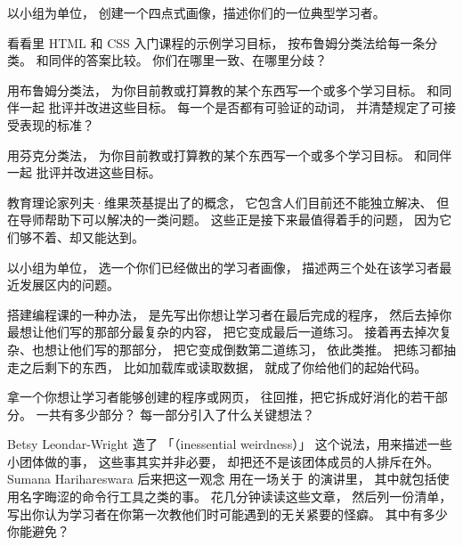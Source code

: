 

以小组为单位，
创建一个四点式画像，描述你们的一位典型学习者。


看看里
HTML 和 CSS 入门课程的示例学习目标，
按布鲁姆分类法给每一条分类。
和同伴的答案比较。
你们在哪里一致、在哪里分歧？


用布鲁姆分类法，
为你目前教或打算教的某个东西写一个或多个学习目标。
和同伴一起
批评并改进这些目标。
每一个是否都有可验证的动词，
并清楚规定了可接受表现的标准？


用芬克分类法，
为你目前教或打算教的某个东西写一个或多个学习目标。
和同伴一起
批评并改进这些目标。


教育理论家列夫·维果茨基提出了的概念，
它包含人们目前还不能独立解决、
但在导师帮助下可以解决的一类问题。
这些正是接下来最值得着手的问题，
因为它们够不着、却又能达到。

以小组为单位，
选一个你们已经做出的学习者画像，
描述两三个处在该学习者最近发展区内的问题。


搭建编程课的一种办法，
是先写出你想让学习者在最后完成的程序，
然后去掉你最想让他们写的那部分最复杂的内容，
把它变成最后一道练习。
接着再去掉次复杂、也想让他们写的那部分，
把它变成倒数第二道练习，
依此类推。
把练习都抽走之后剩下的东西，
比如加载库或读取数据，
就成了你给他们的起始代码。

拿一个你想让学习者能够创建的程序或网页，
往回推，把它拆成好消化的若干部分。
一共有多少部分？
每一部分引入了什么关键想法？


Betsy Leondar-Wright 造了
「（inessential weirdness）」
这个说法，用来描述一些小团体做的事，
这些事其实并非必要，
却把还不是该团体成员的人排斥在外。
Sumana Harihareswara 后来把这一观念
用在一场关于
的演讲里，
其中就包括使用名字晦涩的命令行工具之类的事。
花几分钟读读这些文章，
然后列一份清单，写出你认为学习者在你第一次教他们时可能遇到的无关紧要的怪癖。
其中有多少你能避免？

